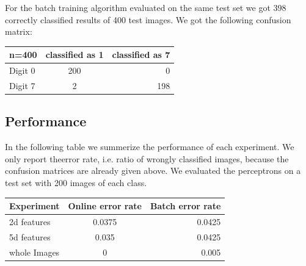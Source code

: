 For the batch training algorithm evaluated on the same test set we got 398 correctly classified results of 400 test images. We got the following confusion matrix:

\begin{tabular}{ l | c | r }
\centering
  n=400 & classified as 1 & classified as 7 \\ \hline
  Digit 0 & 200 & 0 \\
  Digit 7 & 2 & 198 \\
\end{tabular}

\subsection{Performance}
In the following table we summerize the performance of each experiment. We only report theerror rate, i.e. ratio of wrongly classified images, because the confusion matrices are already given above. We evaluated the perceptrons on a test set with 200 images of each class.


\begin{tabular}{ l | c | r }
\centering
  Experiment & Online error rate & Batch error rate \\ \hline
  2d features & 0.0375 & 0.0425 \\
  5d features & 0.035 & 0.0425 \\
  whole Images  & 0 & 0.005 \\
\end{tabular}


